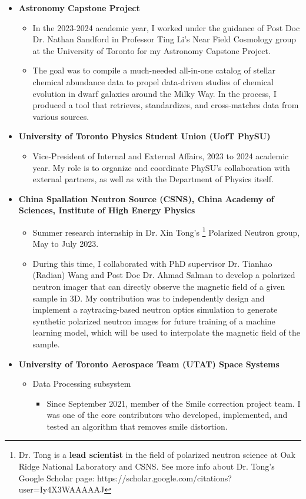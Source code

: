 \documentclass{article}
\begin{document}
\begin{itemize}
    \item \textbf{Astronomy Capstone Project}
    \begin {itemize}
        \item In the 2023-2024 academic year, I worked under the guidance of Post Doc Dr. Nathan Sandford in Professor Ting Li's Near Field Cosmology group at the University of Toronto for my Astronomy Capstone Project. 
        \item The goal was to compile a much-needed all-in-one catalog of stellar chemical abundance data to propel data-driven studies of chemical evolution in dwarf galaxies around the Milky Way. In the process, I produced a tool that retrieves, standardizes, and cross-matches data from various sources. 
    \end {itemize}
    \item \textbf{University of Toronto Physics Student Union (UofT PhySU)}
    \begin{itemize}
        \item Vice-President of Internal and External Affairs, 2023 to 2024 academic year. My role is to organize and coordinate PhySU's collaboration with external partners, as well as with the Department of Physics itself. 
    \end{itemize}
    \item \textbf{China Spallation Neutron Source (CSNS), China Academy of Sciences, Institute of High Energy Physics}
    \begin{itemize}
        \item Summer research internship in Dr. Xin Tong's \footnote[1]{Dr. Tong is a \textbf{lead scientist} in the field of polarized neutron science at Oak Ridge National Laboratory and CSNS. \newline See more info about Dr. Tong's Google Scholar page: https://scholar.google.com/citations?user=Iy4X3WAAAAAJ} Polarized Neutron group, May to July 2023.
        \item During this time, I collaborated with PhD supervisor Dr. Tianhao (Radian) Wang and Post Doc Dr. Ahmad Salman to develop a polarized neutron imager that can directly observe the magnetic field of a given sample in 3D. My contribution was to independently design and implement a raytracing-based neutron optics simulation to generate synthetic polarized neutron images for future training of a machine learning model, which will be used to interpolate the magnetic field of the sample. 
    \end{itemize}
    \item \textbf{University of Toronto Aerospace Team (UTAT) Space Systems}
    \begin{itemize}
        \item Data Processing subsystem
        \begin{itemize}
            \item Since September 2021, member of the Smile correction project team. I was one of the core contributors who developed, implemented, and tested an algorithm that removes smile distortion.
        \end{itemize}


\end{itemize}
\end{itemize}
\end{document}
